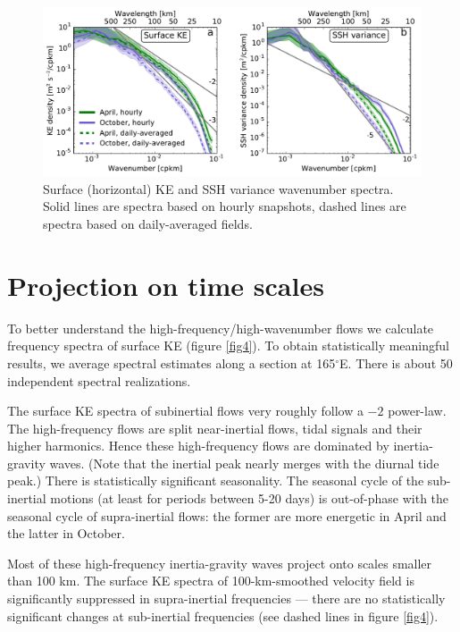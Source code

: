 \documentclass[grl]{agutex2015}
\begin{document}
\begin{article}
\begin{figure}[ht]
  \begin{center}
    \includegraphics[width=.9\textwidth]{figs/fig3.pdf}
 \caption{Surface (horizontal) KE and SSH variance wavenumber spectra. Solid lines
 are spectra based on hourly snapshots, dashed lines are spectra based on daily-averaged
 fields.}
 \label{fig3}
 \end{center}
\end{figure}

\section{Projection on time scales}
To better understand the high-frequency/high-wavenumber flows  we calculate frequency
spectra of surface KE (figure \ref{fig4}). To obtain statistically meaningful results,
we average spectral estimates along a section at 165$^\circ$E.  There is about 50
independent spectral realizations.

The surface KE spectra of subinertial flows very roughly follow a $-2$ power-law.
The high-frequency flows are split near-inertial flows, tidal signals and their
higher harmonics. Hence these high-frequency flows are dominated by inertia-gravity
waves. (Note that the inertial peak nearly merges with the
diurnal tide peak.) There is statistically significant seasonality. The seasonal
cycle of the sub-inertial motions (at least for periods between 5-20 days)
is out-of-phase with the seasonal cycle of supra-inertial flows: the former
are more energetic in April and the latter in October.

Most of these high-frequency inertia-gravity waves project onto scales smaller
than 100 km. The surface KE spectra of 100-km-smoothed velocity field is significantly
suppressed in supra-inertial frequencies --- there are no statistically significant
changes at sub-inertial frequencies (see dashed lines in figure \ref{fig4}).



\end{article}
\end{document}
